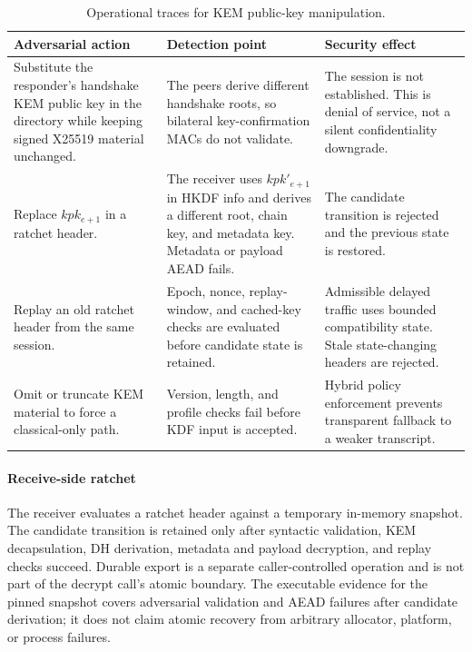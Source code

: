 \documentclass[preprint,12pt]{elsarticle}
\theoremstyle{definition}
\begin{document}
\begin{table}[H]
\centering
\caption{Operational traces for KEM public-key manipulation.}
\label{tab:kem-binding-traces}
\small
\begin{tabularx}{\textwidth}{@{}L{0.26\textwidth}L{0.33\textwidth}Y@{}}
\toprule
Adversarial action & Detection point & Security effect \\
\midrule
Substitute the responder's handshake KEM public key in the directory while keeping signed X25519 material unchanged. & The peers derive different handshake roots, so bilateral key-confirmation MACs do not validate. & The session is not established. This is denial of service, not a silent confidentiality downgrade. \\
Replace $kpk_{e+1}$ in a ratchet header. & The receiver uses $kpk'_{e+1}$ in HKDF info and derives a different root, chain key, and metadata key. Metadata or payload AEAD fails. & The candidate transition is rejected and the previous state is restored. \\
Replay an old ratchet header from the same session. & Epoch, nonce, replay-window, and cached-key checks are evaluated before candidate state is retained. & Admissible delayed traffic uses bounded compatibility state. Stale state-changing headers are rejected. \\
Omit or truncate KEM material to force a classical-only path. & Version, length, and profile checks fail before KDF input is accepted. & Hybrid policy enforcement prevents transparent fallback to a weaker transcript. \\
\bottomrule
\end{tabularx}
\end{table}

\paragraph{Receive-side ratchet}
The receiver evaluates a ratchet header against a temporary in-memory snapshot.
The candidate transition is retained only after syntactic validation, KEM
decapsulation, DH derivation, metadata and payload decryption, and replay checks
succeed. Durable export is a separate caller-controlled operation and is not
part of the decrypt call's atomic boundary.
The executable evidence for the pinned snapshot covers adversarial validation
and AEAD failures after candidate derivation; it does not claim atomic recovery
from arbitrary allocator, platform, or process failures.
\end{document}
